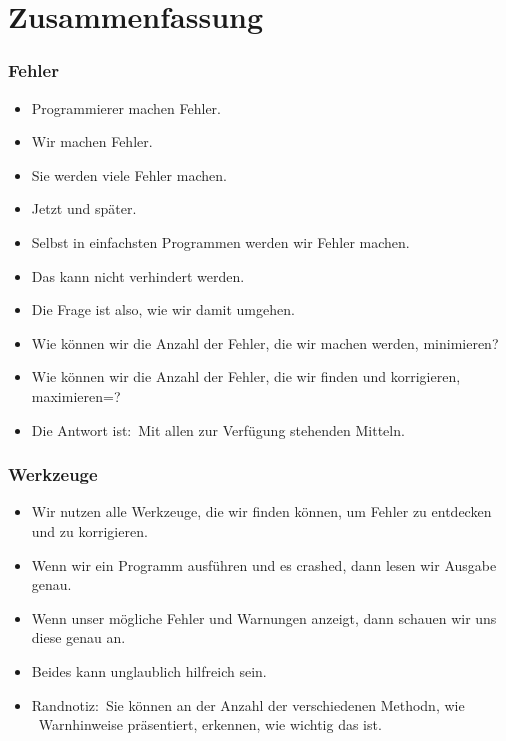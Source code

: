 \documentclass[aspectratio=169,mathserif,notheorems]{beamer}%
\begin{document}
\section{Zusammenfassung}%
%
\begin{frame}%
\frametitle{Fehler}%
\begin{itemize}%
\item Programmierer machen Fehler.%
\item<2-> Wir machen Fehler.%
\item<3-> Sie werden viele Fehler machen.%
\item<4-> Jetzt und später.%
\item<5-> Selbst in einfachsten Programmen werden wir Fehler machen.%
\item<6-> Das kann nicht verhindert werden.%
\item<7-> Die Frage ist also, wie wir damit umgehen.%
\item<8-> Wie können wir die Anzahl der Fehler, die wir machen werden, minimieren?%
\item<9-> Wie können wir die Anzahl der Fehler, die wir finden und korrigieren, maximieren=?%
\item<10-> Die Antwort ist:~\alert{Mit allen zur Verfügung stehenden Mitteln}.%
\end{itemize}%
\end{frame}%
%
\begin{frame}%
\frametitle{Werkzeuge}%
\begin{itemize}%
\item Wir nutzen \alert{alle} Werkzeuge, die wir finden können, um Fehler zu entdecken und zu korrigieren.%
\item<2-> Wenn wir ein Programm ausführen und es crashed, dann lesen wir Ausgabe genau.%
\item<3-> Wenn unser  mögliche Fehler und Warnungen anzeigt, dann schauen wir uns diese genau an.%
\item<4-> Beides kann unglaublich hilfreich sein.%
\item<5-> Randnotiz:~Sie können an der Anzahl der verschiedenen Methodn, wie \pycharm\ Warnhinweise präsentiert, erkennen, wie wichtig das ist.%
\end{itemize}%
\end{frame}%
%
\end{document}
